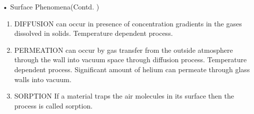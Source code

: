 \documentclass[11pt]{beamer}
\begin{document}
\begin{frame}{• Surface Phenomena(Contd. )}

\begin{enumerate}
\item DIFFUSION can occur in presence of concentration gradients in the gases dissolved in solids. Temperature dependent process.

\item PERMEATION can occur by gas transfer from the outside atmosphere through the wall into vacuum space through diffusion process. Temperature dependent process. Significant amount of helium can permeate through glass walls into vacuum.

\item SORPTION If a material traps the air molecules in its surface then the  process is called sorption.

\end{enumerate}

	


\end{frame}
\end{document}
